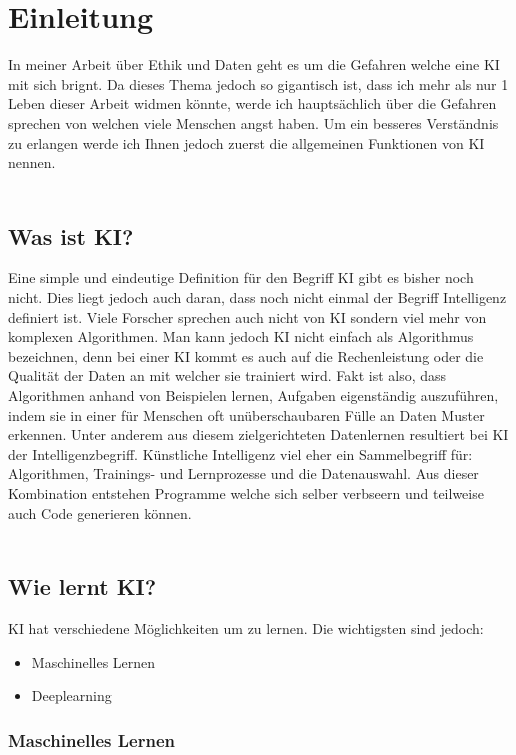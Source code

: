 \chapter{Einleitung}
In meiner Arbeit über Ethik und Daten geht es um die Gefahren welche eine KI mit sich brignt. Da dieses Thema jedoch so gigantisch ist, dass ich mehr als nur 1 Leben dieser Arbeit widmen könnte, werde ich hauptsächlich über die Gefahren sprechen von welchen viele Menschen angst haben.
Um ein besseres Verständnis zu erlangen werde ich Ihnen jedoch zuerst die allgemeinen Funktionen von KI nennen.
\\
\\
\section{Was ist KI?}
Eine simple und eindeutige Definition für den Begriff KI gibt es bisher noch nicht. Dies liegt jedoch auch daran, dass noch nicht einmal der Begriff Intelligenz definiert ist.
Viele Forscher sprechen auch nicht von KI sondern viel mehr von komplexen Algorithmen. Man kann jedoch KI nicht einfach als Algorithmus bezeichnen, denn bei einer KI kommt es auch auf die Rechenleistung oder die Qualität der Daten an mit welcher sie trainiert wird. 
Fakt ist also, dass Algorithmen anhand von Beispielen lernen, Aufgaben eigenständig auszuführen, indem sie in einer für Menschen oft unüberschaubaren Fülle an Daten Muster erkennen. Unter anderem aus diesem zielgerichteten Datenlernen resultiert bei KI der Intelligenzbegriff.
Künstliche Intelligenz viel eher ein Sammelbegriff für: Algorithmen, Trainings- und Lernprozesse und die Datenauswahl. Aus dieser Kombination entstehen Programme welche sich selber verbseern und teilweise auch Code generieren können.
\\
\\
\section{Wie lernt KI?}
KI hat verschiedene Möglichkeiten um zu lernen. Die wichtigsten sind jedoch:
\begin{itemize}
    \item Maschinelles Lernen
    \item Deeplearning
\end{itemize}

\subsection{Maschinelles Lernen}

